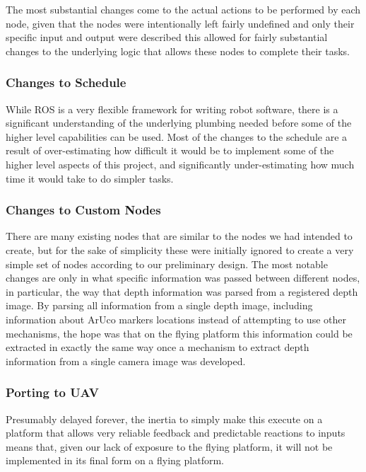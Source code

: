 \documentclass{article}[12]
\begin{document}
		The most substantial changes come to the actual actions to be performed by each node, given that the nodes were intentionally left fairly undefined and only their specific input and output were described this allowed for fairly substantial changes to the underlying logic that allows these nodes to complete their tasks.


		\subsubsection{Changes to Schedule}
	
	While ROS is a very flexible framework for writing robot software, there is a significant understanding of the underlying plumbing needed before some of the higher level capabilities can be used. Most of the changes to the schedule are a result of over-estimating how difficult it would be to implement some of the higher level aspects of this project, and significantly under-estimating how much time it would take to do simpler tasks.
	
		\subsubsection{Changes to Custom Nodes}
	
	There are many existing nodes that are similar to the nodes we had intended to create, but for the sake of simplicity these were initially ignored to create a very simple set of nodes according to our preliminary design. The most notable changes are only in what specific information was passed between different nodes, in particular, the way that depth information was parsed from a registered depth image. By parsing all information from a single depth image, including information about ArUco markers locations instead of attempting to use other mechanisms, the hope was that on the flying platform this information could be extracted in exactly the same way once a mechanism to extract depth information from a single camera image was developed.
	
	\subsubsection{Porting to UAV}
	
	Presumably delayed forever, the inertia to simply make this execute on a platform that allows very reliable feedback and predictable reactions to inputs means that, given our lack of exposure to the flying platform, it will not be implemented in its final form on a flying platform. 
\end{document}
